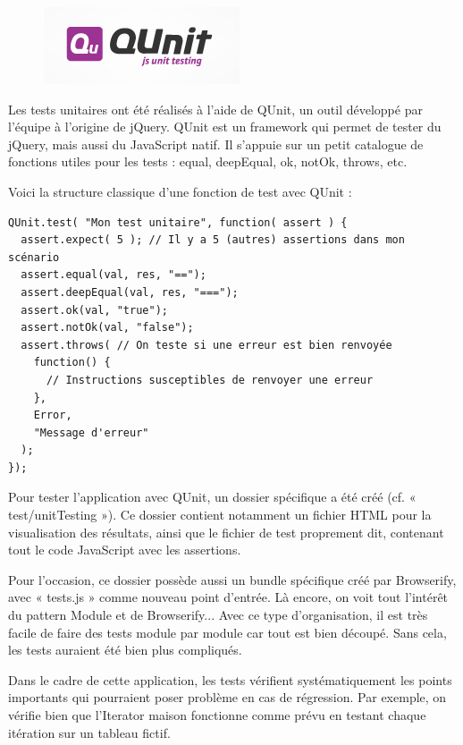 \documentclass[a4paper,12pt]{article}
\begin{document}
\begin{figure}[!h]
  \begin{center}
    \includegraphics[scale=0.7]{logo-qunit.png}
  \end{center}
\end{figure}

Les tests unitaires ont été réalisés à l'aide de QUnit, un outil développé par l'équipe à l'origine de jQuery. QUnit est un framework qui permet de tester du jQuery, mais aussi du JavaScript natif. Il s'appuie sur un petit catalogue de fonctions utiles pour les tests : equal, deepEqual, ok, notOk, throws, etc.

Voici la structure classique d'une fonction de test avec QUnit :

\vspace{7pt}

\begin{lstlisting}
QUnit.test( "Mon test unitaire", function( assert ) {
  assert.expect( 5 ); // Il y a 5 (autres) assertions dans mon scénario
  assert.equal(val, res, "==");
  assert.deepEqual(val, res, "===");
  assert.ok(val, "true");
  assert.notOk(val, "false");
  assert.throws( // On teste si une erreur est bien renvoyée
    function() {
      // Instructions susceptibles de renvoyer une erreur
    },
    Error,
    "Message d'erreur"
  );
});
\end{lstlisting}

Pour tester l'application avec QUnit, un dossier spécifique a été créé (cf. « test/unitTesting »). Ce dossier contient notamment un fichier HTML pour la visualisation des résultats, ainsi que le fichier de test proprement dit, contenant tout le code JavaScript avec les assertions.

Pour l'occasion, ce dossier possède aussi un bundle spécifique créé par Browserify, avec « tests.js » comme nouveau point d'entrée. Là encore, on voit tout l'intérêt du pattern Module et de Browserify... Avec ce type d'organisation, il est très facile de faire des tests module par module car tout est bien découpé. Sans cela, les tests auraient été bien plus compliqués.

Dans le cadre de cette application, les tests vérifient systématiquement les points importants qui pourraient poser problème en cas de régression. Par exemple, on vérifie bien que l'Iterator maison fonctionne comme prévu en testant chaque itération sur un tableau fictif.
\end{document}
